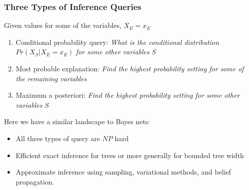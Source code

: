 \documentclass{article}
\begin{document}
\subsubsection{Three Types of Inference Queries}
\begin{flushleft}
    Given values for some of the variables, $X_E=x_E$
    \begin{enumerate}
        \item Conditional probability query: \textit{What is the conditional distribution} $Pr(X_S|X_E = x_E)$ \textit{for some other variables} $S$
        \item Most probable explanation: \textit{Find the highest probability setting for some of the remaining variables}
        \item Maximum a posteriori: \textit{Find the highest probability setting for some other variables } $S$
    \end{enumerate}
\end{flushleft}
\begin{flushleft}
    Here we have a similar landscape to Bayes nets:
    \begin{itemize}
        \item All three types of query are $NP$ hard
        \item Efficient exact inference for trees or more generally for bounded tree width
        \item Approximate inference using sampling, variational methods, and belief propagation.
    \end{itemize}
\end{flushleft}
\end{document}
